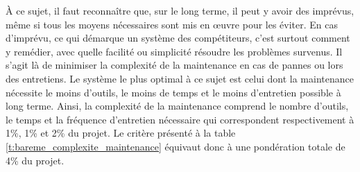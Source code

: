 \begin{table}
   \caption{Évaluation de la complexité de la maintenance}
   \label{t:bareme_complexite_maintenance}
\end{table}

À ce sujet, il faut reconnaître que, sur le long terme, il peut y avoir des imprévus, même si tous les moyens nécessaires sont mis en œuvre pour les éviter. En cas d’imprévu, ce qui démarque un système des compétiteurs, c’est surtout comment y remédier, avec quelle facilité ou simplicité résoudre les problèmes survenus. Il s’agit là de minimiser la complexité de la maintenance en cas de pannes ou lors des entretiens. Le système le plus optimal à ce sujet est celui dont la maintenance nécessite le moins d’outils, le moins de temps et le moins d’entretien possible à long terme. Ainsi, la complexité de la maintenance comprend le nombre d'outils, le temps et la fréquence d'entretien nécessaire qui correspondent respectivement à 1\%, 1\% et 2\% du projet. Le critère présenté à la table \ref{t:bareme_complexite_maintenance} équivaut donc à une pondération totale de 4\% du projet.

